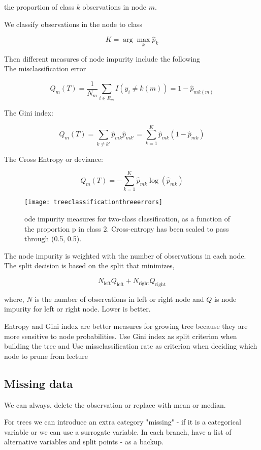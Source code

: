 the proportion of class $k$ observations in node $m$.

We classify observations in the node to class

\[
    K = \arg \max\limits_k \hat{p}_k
\]

Then different measures of node impurity include the following\\

The misclassification error

\[
    Q_m(T) = \frac{1}{N_m} \sum_{i \in R_m} I(y_i \neq k(m)) = 1 - \hat{p}_{mk(m)}
\]

The Gini index:

\[
    Q_m(T) = \sum_{k \neq k'} \hat{p}_{mk} \hat{p}_{mk'} = \sum_{k=1}^{K}  \hat{p}_{mk} (1 -  \hat{p}_{mk})
\]

The Cross Entropy or deviance:

\[
    Q_m (T) = - \sum_{k=1}^{K}  \hat{p}_{mk} \log (  \hat{p}_{mk} )
\]

\begin{figure}[H]
  \centering
  \texttt{[image: treeclassificationthreeerrors]}
  \caption{ode impurity measures for two-class classification, as a function of the proportion p in class 2. Cross-entropy has been scaled to pass through (0.5, 0.5).}\label{fig:treeclassificationthreeerrors}
\end{figure}

The node impurity is weighted with the number of observations in
each node.
The split decision is based on the split that minimizes,

\[
    N_{\text{left}}Q_{\text{left}} + N_{\text{right}}Q_{\text{right}}
\]

where, $N$ is the number of observations in left or right node and $Q$ is node impurity for left or right node. Lower is better.

Entropy and Gini index are
better measures for
growing tree because they
are more sensitive to node
probabilities. Use Gini index as split criterion when building the tree and Use missclassification rate as criterion when deciding which
node to prune from lecture \cite[p.~54-55]{lecture8}

\subsection{Missing data}

We can always, delete the observation or replace with mean or median.

For trees we can introduce an extra category "missing" - if it is a categorical variable or we can use a surrogate variable. In each branch, have a list of alternative variables and split points - as a backup.

